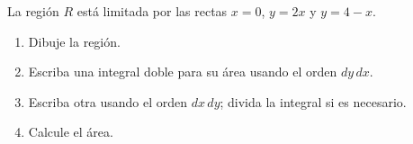 La región $R$ está limitada por las rectas $x=0$, $y=2x$ y $y=4-x$.
\begin{enumerate}
    \item Dibuje la región.
    \item Escriba una integral doble para su área usando el orden $dy\,dx$.
    \item Escriba otra usando el orden $dx\,dy$; divida la integral si es necesario.
    \item Calcule el área.
\end{enumerate}
